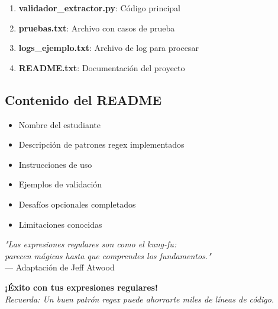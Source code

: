 \documentclass[11pt,letterpaper]{article}
\begin{document}
\begin{enumerate}
    \item \textbf{validador\_extractor.py}: Código principal
    \item \textbf{pruebas.txt}: Archivo con casos de prueba
    \item \textbf{logs\_ejemplo.txt}: Archivo de log para procesar
    \item \textbf{README.txt}: Documentación del proyecto
\end{enumerate}

\subsection{Contenido del README}

\begin{itemize}
    \item Nombre del estudiante
    \item Descripción de patrones regex implementados
    \item Instrucciones de uso
    \item Ejemplos de validación
    \item Desafíos opcionales completados
    \item Limitaciones conocidas
\end{itemize}

\vspace{1cm}

\begin{center}
\textit{"Las expresiones regulares son como el kung-fu:}\\
\textit{parecen mágicas hasta que comprendes los fundamentos."}\\
\vspace{0.3cm}
--- Adaptación de Jeff Atwood
\end{center}

\vspace{0.5cm}

\begin{center}
\textbf{¡Éxito con tus expresiones regulares!}\\
\textit{Recuerda: Un buen patrón regex puede ahorrarte miles de líneas de código.}
\end{center}
\end{document}
